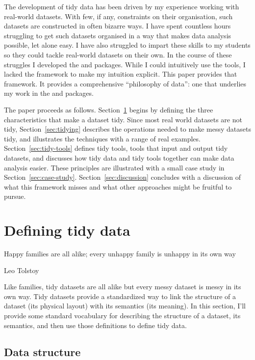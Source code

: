 \documentclass[article]{jss}
\begin{document}
The development of tidy data has been driven by my experience working with real-world datasets. With few, if any, constraints on their organisation, such datasets are constructed in often bizarre ways. I have spent countless hours struggling to get such datasets organised in a way that makes data analysis possible, let alone easy. I have also struggled to impart these skills to my students so they could tackle real-world datasets on their own. In the course of these struggles I developed the  and  \citep{wickham:2007b}  packages. While I could intuitively use the tools, I lacked the framework to make my intuition explicit. This paper provides that framework. It provides a comprehensive ``philosophy of data'': one that underlies my work in the  \citep{me:plyr} and  \citep{me:ggplot2} packages.

The paper proceeds as follows. Section~\ref{sec:defining} begins by defining the three characteristics that make a dataset tidy. Since most real world datasets are not tidy, Section~\ref{sec:tidying} describes the operations needed to make messy datasets tidy, and illustrates the techniques with a range of real examples. Section~\ref{sec:tidy-tools} defines tidy tools, tools that input and output tidy datasets, and discusses how tidy data and tidy tools together can make data analysis easier. These principles are illustrated with a small case study in Section~\ref{sec:case-study}. Section~\ref{sec:discussion} concludes with a discussion of what this framework misses and what other approaches might be fruitful to pursue.

\section{Defining tidy data}
\label{sec:defining}

\epigraph{Happy families are all alike; every unhappy family is unhappy in its own way}{Leo Tolstoy}

Like families, tidy datasets are all alike but every messy dataset is messy in its own way. Tidy datasets provide a standardized way to link the structure of a dataset (its physical layout) with its semantics (its meaning). In this section, I'll provide some standard vocabulary for describing the structure of a dataset, its semantics, and then use those definitions to define tidy data.

\subsection{Data structure}
\end{document}

